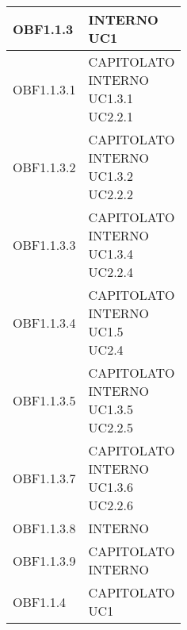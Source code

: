 \documentclass{scalatekids-article}
\begin{document}
\begin{longtable}[H]{|p{5.5cm}|p{5.5cm}|}
\hline
OBF1.1.3 & \multiLineCell[t]{INTERNO\\UC1\\}\\
\hline
OBF1.1.3.1 & \multiLineCell[t]{CAPITOLATO\\INTERNO\\UC1.3.1\\UC2.2.1\\}\\
\hline
OBF1.1.3.2 & \multiLineCell[t]{CAPITOLATO\\INTERNO\\UC1.3.2\\UC2.2.2\\}\\
\hline
OBF1.1.3.3 & \multiLineCell[t]{CAPITOLATO\\INTERNO\\UC1.3.4\\UC2.2.4\\}\\
\hline
OBF1.1.3.4 & \multiLineCell[t]{CAPITOLATO\\INTERNO\\UC1.5\\UC2.4\\}\\
\hline
OBF1.1.3.5 & \multiLineCell[t]{CAPITOLATO\\INTERNO\\UC1.3.5\\UC2.2.5\\}\\
\hline
OBF1.1.3.7 & \multiLineCell[t]{CAPITOLATO\\INTERNO\\UC1.3.6\\UC2.2.6\\}\\
\hline
OBF1.1.3.8 & \multiLineCell[t]{INTERNO\\}\\
\hline
OBF1.1.3.9 & \multiLineCell[t]{CAPITOLATO\\INTERNO\\}\\
\hline
OBF1.1.4 & \multiLineCell[t]{CAPITOLATO\\UC1\\}\\

\end{longtable}
\end{document}
